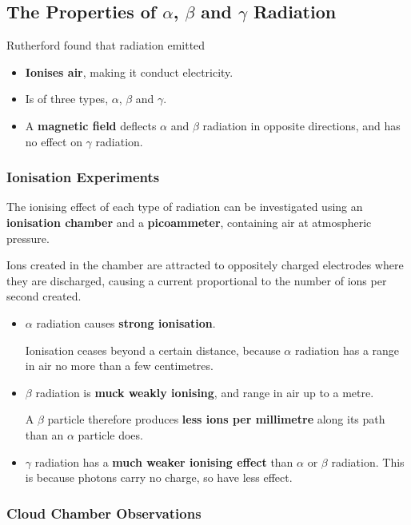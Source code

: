 \subsection{The Properties of $\alpha$, $\beta$ and $\gamma$ Radiation}

Rutherford found that radiation emitted
\begin{itemize}
    \item \textbf{Ionises air}, making it conduct electricity.
    \item Is of three types, $\alpha$, $\beta$ and $\gamma$.
    \item A \textbf{magnetic field} deflects $\alpha$ and $\beta$ radiation in opposite directions, and has no effect on $\gamma$ radiation.
\end{itemize}

\subsubsection*{Ionisation Experiments}

The ionising effect of each type of radiation can be investigated using an \textbf{ionisation chamber} and a \textbf{picoammeter}, containing air at atmospheric pressure.

Ions created in the chamber are attracted to oppositely charged electrodes where they are discharged, causing a current proportional to the number of ions per second created.
\begin{itemize}
    \item $\alpha$ radiation causes \textbf{strong ionisation}.

        Ionisation ceases beyond a certain distance, because $\alpha$ radiation has a range in air no more than a few centimetres.
    \item $\beta$ radiation is \textbf{muck weakly ionising}, and range in air up to a metre.

        A $\beta$ particle therefore produces \textbf{less ions per millimetre} along its path than an $\alpha$ particle does.
    \item $\gamma$ radiation has a \textbf{much weaker ionising effect} than $\alpha$ or $\beta$ radiation. This is because photons carry no charge, so have less effect.
\end{itemize}

\subsubsection*{Cloud Chamber Observations}

